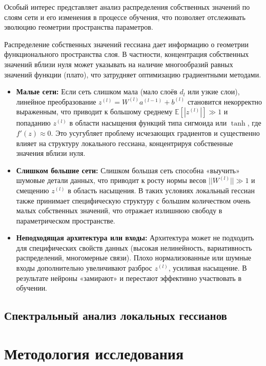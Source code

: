 \documentclass[a4paper,12pt]{article}
\begin{document}
Особый интерес представляет анализ распределения собственных значений по слоям сети и его изменения в
процессе обучения, что позволяет отслеживать эволюцию геометрии пространства параметров.

Распределение собственных значений гессиана дает информацию о геометрии функционального пространства слоя. В
частности, концентрация собственных значений вблизи нуля может указывать на наличие многообразий равных
значений функции (плато), что затрудняет оптимизацию градиентными методами.

\begin{itemize}
  \item \textbf{Малые сети:} Если сеть слишком мала (мало слоёв $d_l$ или узкие слои), линейное
    преобразование $z^{(l)}=W^{(l)}a^{(l-1)}+b^{(l)}$ становится некорректно выраженным, что приводит к
    большому среднему $\mathbb{E}[|z^{(l)}|]\gg1$ и попаданию $z^{(l)}$ в области насыщения функций типа
    сигмоида или $\tanh$, где $f'(z)\approx0$. Это усугубляет проблему исчезающих градиентов и существенно
    влияет на структуру локального гессиана, концентрируя собственные значения вблизи нуля.
  \item \textbf{Слишком большие сети:} Слишком большая сеть способна «выучить» шумовые детали данных, что
    приводит к росту нормы весов $||W^{(l)}||\gg1$ и смещению $z^{(l)}$ в область насыщения. В таких условиях
    локальный гессиан также принимает специфическую структуру с большим количеством очень малых собственных
    значений, что отражает излишнюю свободу в параметрическом пространстве.
  \item \textbf{Неподходящая архитектура или входы:} Архитектура может не подходить для специфических свойств
    данных (высокая нелинейность, вариативность распределений, многомерные связи). Плохо нормализованные или
    шумные входы дополнительно увеличивают разброс $z^{(l)}$, усиливая насыщение. В результате нейроны
    «замирают» и перестают эффективно участвовать в обучении.
\end{itemize}

\subsection{Спектральный анализ локальных гессианов}

\section{Методология исследования}
\end{document}
